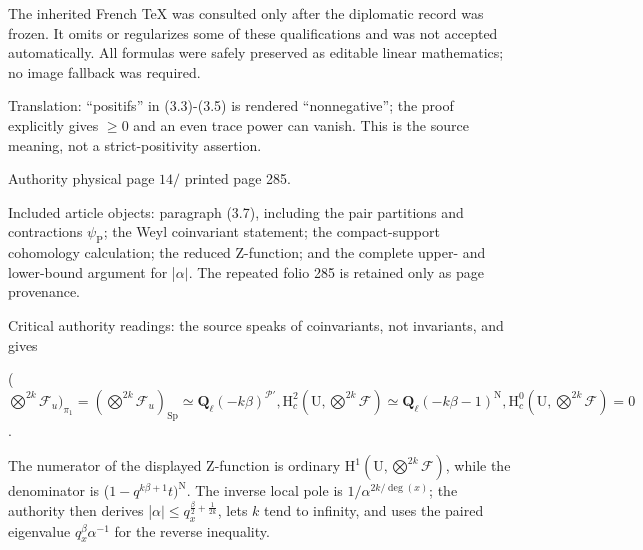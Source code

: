 \documentclass[10pt,leqno]{article}
\begin{document}
\noindent The inherited French TeX was consulted only after the diplomatic record was frozen. It omits or regularizes some of these qualifications and was not accepted automatically. All formulas were safely preserved as editable linear mathematics; no image fallback was required.\par

\noindent Translation: “positifs” in (3.3)-(3.5) is rendered “nonnegative”; the proof explicitly gives \(\geq 0\) and an even trace power can vanish. This is the source meaning, not a strict-positivity assertion.\par

\clearpage

\label{physical-14}\par\smallskip

\noindent Authority physical page \(14 /\) printed page 285.\par

\noindent Included article objects: paragraph (3.7), including the pair partitions and contractions \(\psi _{\mathrm{P}}\); the Weyl coinvariant statement; the compact-support cohomology calculation; the reduced \(\mathrm{Z}\)-function; and the complete upper- and lower-bound argument for |\(\alpha |\). The repeated folio 285 is retained only as page provenance.\par

\noindent Critical authority readings: the source speaks of coinvariants, not invariants, and gives\par

\noindent (\(\bigotimes\limits^{2k}\mathcal{F} _{u})_{\pi _{1}}=(\bigotimes\limits^{2k}\mathcal{F} _{u})_{\operatorname{Sp}}\simeq \mathbf{Q}_{\ell }(- k\beta )^{\mathcal{P} '}, \mathrm{H}_{c}^{2}(\mathrm{U},\bigotimes\limits^{2k}\mathcal{F} )\simeq \mathbf{Q}_{\ell }(- k\beta - 1)^{\mathrm{N}}, \mathrm{H}_{c}^{0}(\mathrm{U},\bigotimes\limits^{2k}\mathcal{F} )=0\).\par

\noindent The numerator of the displayed \(\mathrm{Z}\)-function is ordinary \(\mathrm{H}^{1}(\mathrm{U},\bigotimes\limits^{2k}\mathcal{F} )\), while the denominator is (\(1- q^{k\beta +1}t)^{\mathrm{N}}\). The inverse local pole is \(1/\alpha ^{2k/\operatorname{deg}(x)}\); the authority then derives |\(\alpha |\leq q_{x}^{\frac{\beta}{2}+\frac{1}{2k}}\), lets \(k\) tend to infinity, and uses the paired eigenvalue \(q_{x}^{\beta } \alpha ^{- 1}\) for the reverse inequality.\par
\end{document}
